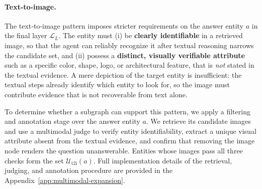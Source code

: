 \documentclass[11pt]{article}
\begin{document}
\paragraph{Text-to-image.}
The text‑to‑image pattern imposes stricter requirements on the answer entity $a$ in the final layer $\mathcal{L}_L$. The entity must (i) be \textbf{clearly identifiable} in a retrieved image, so that the agent can reliably recognize it after textual reasoning narrows the candidate set, and (ii) possess a \textbf{distinct, visually verifiable attribute} such as a specific color, shape, logo, or architectural feature, that is \emph{not} stated in the textual evidence. A mere depiction of the target entity is insufficient: the textual steps already identify which entity to look for, so the image must contribute evidence that is not recoverable from text alone.

To determine whether a subgraph can support this pattern, we apply a filtering and annotation stage over the answer entity $a$. We retrieve its candidate images and use a multimodal judge to verify entity identifiability, extract a unique visual attribute absent from the textual evidence, and confirm that removing the image node renders the question unanswerable. Entities whose images pass all three checks form the set $\mathcal{U}_{\mathrm{t2i}}(a)$. Full implementation details of the retrieval, judging, and annotation procedure are provided in the Appendix~\ref{app:multimodal-expansion}.
\end{document}
